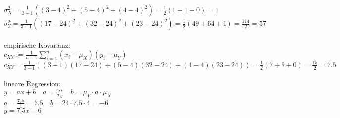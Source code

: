\documentclass[a4paper]{article}
\begin{document}
\(\sigma_X^2=\frac{1}{3-1}\left((3-4)^2+(5-4)^2+(4-4)^2\right)=\frac{1}{2}(1+1+0)=1\)\\
\(\sigma^2_Y=\frac{1}{3-1}\left((17-24)^2+(32-24)^2+(23-24)^2\right)=\frac{1}{2}(49+64+1)=\frac{114}{2}=57\)\\\\
empirische Kovarianz:\\
\(c_{XY}:= \frac{1}{n-1}\sum\limits^n_{i=1}(x_i-\mu_X)(y_i-\mu_Y)\)\\
\(c_{XY} = \frac{1}{3-1}\left((3-1)(17-24)+(5-4)(32-24)+(4-4)(23-24)\right)=\frac{1}{2}(7+8+0)=\frac{15}{2}=7.5\)\\\\
lineare Regression:\\
\(y=ax+b\quad a=\frac{c_{XY}}{\sigma_X}\quad b=\mu_Y\cdot a \cdot \mu_X\)\\
\(a=\frac{7,5}{1}=7.5\quad b=24\cdot 7.5 \cdot 4=-6\)\\
\(y=7.5x-6\)
\end{document}
